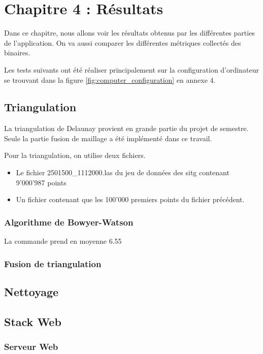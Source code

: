 
\chapter{Chapitre 4 : Résultats}
Dans ce chapitre, nous allons voir les résultats obtenus par les
différentes parties de l'application. On va aussi comparer les différentes
métriques collectés des binaires.

Les tests suivants ont été réaliser principalement sur la configuration d'ordinateur
se trouvant dans la figure \ref{fig:computer_configuration} en annexe 4.

\section{Triangulation}

La triangulation de Delaunay provient en grande partie du projet de semestre.
Seule la partie fusion de maillage a été implémenté dans ce travail.

Pour la triangulation, on utilise deux fichiers.
\begin{itemize}
	\item Le fichier 2501500_1112000.las du jeu de données des \gls{sitg} contenant 9'000'987 points
	\item Un fichier contenant que les 100'000 premiers points du fichier précédent.
\end{itemize}

\subsection{Algorithme de Bowyer-Watson}


La commande prend en moyenne 6.55 

\subsection{Fusion de triangulation}

\section{Nettoyage}

\section{Stack Web}
\subsection{Serveur Web}

